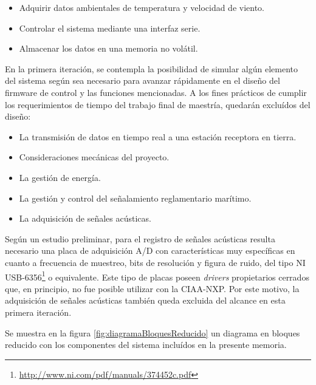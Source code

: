 \begin{itemize}
	\item Adquirir datos ambientales de temperatura y velocidad de viento.
	\item Controlar el sistema mediante una interfaz serie.
	\item Almacenar los datos en una memoria no volátil.
\end{itemize}

En la primera iteración, se contempla la posibilidad de simular algún elemento del sistema según sea necesario para avanzar rápidamente en el diseño del firmware de control y las funciones mencionadas. A los fines prácticos de cumplir los requerimientos de tiempo del trabajo final de maestría, quedarán excluídos del diseño:

\begin{itemize}
	\item La transmisión de datos en tiempo real a una estación receptora en tierra.
	\item Consideraciones mecánicas del proyecto.
	\item La gestión de energía.
	\item La gestión y control del señalamiento reglamentario marítimo.
	\item La adquisición de señales acústicas.
\end{itemize}

Según un estudio preliminar, para el registro de señales acústicas resulta necesario una placa de adquisición A/D con características muy específicas en cuanto a frecuencia de muestreo, bits de resolución y figura de ruido, del tipo NI USB-6356\footnote{\url{http://www.ni.com/pdf/manuals/374452c.pdf}} o equivalente.  Este tipo de placas poseen \textit{drivers} propietarios cerrados que, en principio, no fue posible utilizar con la CIAA-NXP.   Por este motivo, la adquisición de señales acústicas también queda excluida del alcance en esta primera iteración.

Se muestra en la figura \ref{fig:diagramaBloquesReducido} un diagrama en bloques reducido con los componentes del sistema incluídos en la presente memoria.

